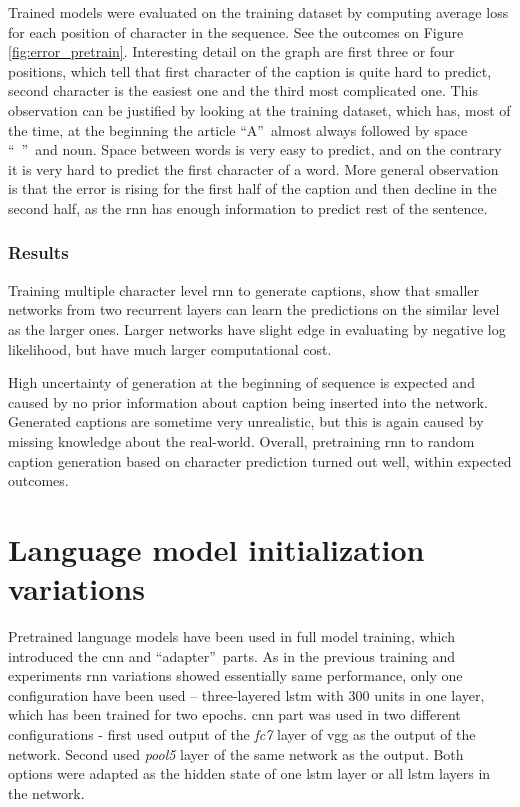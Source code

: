 Trained models were evaluated on the training dataset by computing average loss for each position of character in the sequence. See the outcomes on Figure \ref{fig:error_pretrain}. Interesting detail on the graph are first three or four positions, which tell that first character of the caption is quite hard to predict, second character is the easiest one and the third most complicated one. This observation can be justified by looking at the training dataset, which has, most of the time, at the beginning the article \textquotedblleft A\textquotedblright\ almost always followed by space \textquotedblleft\ \textquotedblright\ and noun. Space between words is very easy to predict, and on the contrary it is very hard to predict the first character of a word. More general observation is that the error is rising for the first half of the caption and then decline in the second half, as the \gls{rnn} has enough information to predict rest of the sentence.

\subsubsection{Results}

Training multiple character level \gls{rnn} to generate captions, show that smaller networks from two recurrent layers can learn the predictions on the similar level as the larger ones. Larger networks have slight edge in evaluating by negative log likelihood, but have much larger computational cost.

High uncertainty of generation at the beginning of sequence is expected and caused by no prior information about caption being inserted into the network. Generated captions are sometime very unrealistic, but this is again caused by missing knowledge about the real-world. Overall, pretraining \gls{rnn} to random caption generation based on character prediction turned out well, within expected outcomes.

\section{Language model initialization variations} \label{sec:exfullmodel}

Pretrained language models have been used in full model training, which introduced the \gls{cnn} and \textquotedblleft adapter\textquotedblright\ parts. As in the previous training and experiments \gls{rnn} variations showed essentially same performance, only one configuration have been used -- three-layered \gls{lstm} with 300 units in one layer, which has been trained for two epochs. \gls{cnn} part was used in two different configurations - first used output of the \emph{fc7} layer of \gls{vgg} as the output of the network. Second used \emph{pool5} layer of the same network as the output. Both options were adapted as the hidden state of one \gls{lstm} layer or all \gls{lstm} layers in the network.

